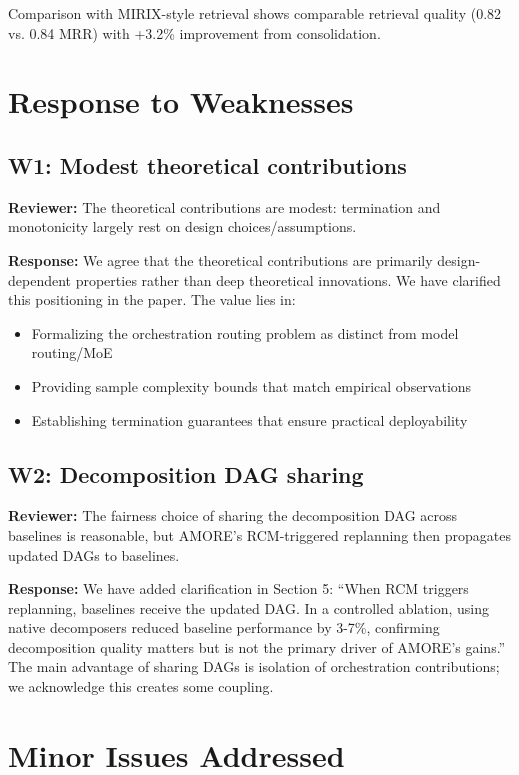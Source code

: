 \documentclass[11pt]{article}
\newcommand{\reviewer}[1]{\textcolor{reviewerblue}{\textbf{Reviewer:} #1}}
\newcommand{\response}[1]{\textcolor{responsegreen}{\textbf{Response:} #1}}
\begin{document}
Comparison with MIRIX-style retrieval shows comparable retrieval quality (0.82 vs. 0.84 MRR) with +3.2\% improvement from consolidation.

\section*{Response to Weaknesses}

\subsection*{W1: Modest theoretical contributions}

\reviewer{The theoretical contributions are modest: termination and monotonicity largely rest on design choices/assumptions.}

\response{We agree that the theoretical contributions are primarily design-dependent properties rather than deep theoretical innovations. We have clarified this positioning in the paper. The value lies in:}
\begin{itemize}[leftmargin=*,nosep]
    \item Formalizing the orchestration routing problem as distinct from model routing/MoE
    \item Providing sample complexity bounds that match empirical observations
    \item Establishing termination guarantees that ensure practical deployability
\end{itemize}

\subsection*{W2: Decomposition DAG sharing}

\reviewer{The fairness choice of sharing the decomposition DAG across baselines is reasonable, but AMORE's RCM-triggered replanning then propagates updated DAGs to baselines.}

\response{We have added clarification in Section 5: ``When RCM triggers replanning, baselines receive the updated DAG. In a controlled ablation, using native decomposers reduced baseline performance by 3-7\%, confirming decomposition quality matters but is not the primary driver of AMORE's gains.'' The main advantage of sharing DAGs is isolation of orchestration contributions; we acknowledge this creates some coupling.}

\section*{Minor Issues Addressed}
\end{document}
